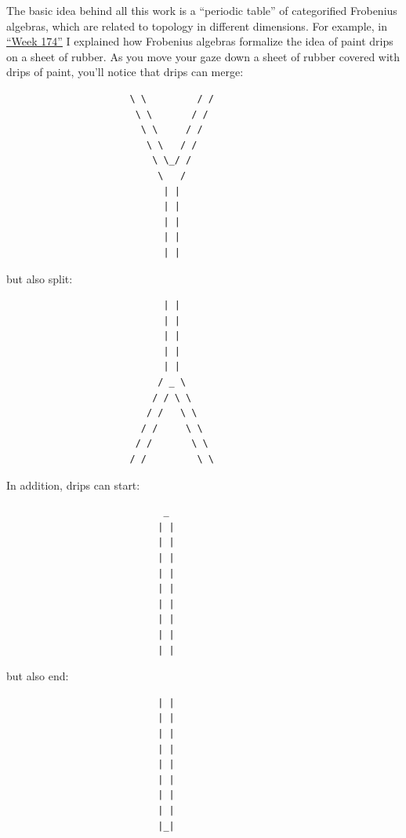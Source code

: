 \documentclass{article}
\begin{document}
The basic idea behind all this work is a ``periodic table'' of
categorified Frobenius algebras, which are related to topology in
different dimensions. For example, in \protect\hyperlink{week174}{``Week
174''} I explained how Frobenius algebras formalize the idea of paint
drips on a sheet of rubber. As you move your gaze down a sheet of rubber
covered with drips of paint, you'll notice that drips can merge:

\begin{verbatim}
                      \ \         / /  
                       \ \       / /
                        \ \     / /
                         \ \   / /
                          \ \_/ /      
                           \   /                                        
                            | |
                            | |
                            | |
                            | |
                            | |   
\end{verbatim}

but also split:

\begin{verbatim}
                            | |
                            | |   
                            | |
                            | |
                            | |
                           / _ \                                            
                          / / \ \      
                         / /   \ \
                        / /     \ \
                       / /       \ \
                      / /         \ \ 
\end{verbatim}

In addition, drips can start:

\begin{verbatim}
                            _
                           | |
                           | |
                           | |
                           | |
                           | |
                           | |
                           | |
                           | |
                           | |
\end{verbatim}

but also end:

\begin{verbatim}
                           | |
                           | |
                           | |
                           | |
                           | |
                           | |
                           | |
                           | |
                           |_|
\end{verbatim}
\end{document}
